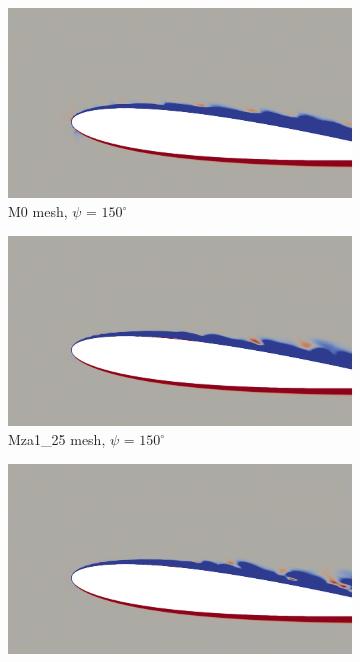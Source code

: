\begin{figure}[H]
	\centering
	\begin{center}
		\begin{subfigure}[b]{0.475\textwidth}
			\centering
			\includegraphics[width=1\textwidth]{figures/zonal_adapt_results/vorticity_plots/v2/M0/spavg/phase_150.png}
			\caption{M0 mesh, $\psi$ = $150^\circ$}
			\label{fig:M0_sp_psi150}
		\end{subfigure}
	\end{center}
	\begin{subfigure}[b]{0.475\textwidth}
		\centering
		\includegraphics[width=1\textwidth]{figures/zonal_adapt_results/vorticity_plots/v2/Mza1_25/spavg/phase_150.png}
		\caption{Mza1\_25 mesh, $\psi$ = $150^\circ$}
		\label{fig:Mza1_25_sp_psi150}
	\end{subfigure}
	\begin{subfigure}[b]{0.475\textwidth}
		\centering
		\includegraphics[width=1\textwidth]{figures/zonal_adapt_results/vorticity_plots/v2/Mza1_50/spavg/phase_150.png}

\end{subfigure}
\end{figure}
